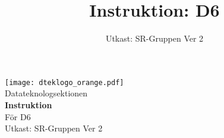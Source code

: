 \documentclass[a4paper]{dtek}
\title{Instruktion: D6}
\date{Utkast: SR-Gruppen Ver 2}
\begin{document}
\begin{titlepage}
  \thispagestyle{empty} %
  \vspace*{\fill}
  \begin{center}
    \texttt{[image: dteklogo\_orange.pdf]}\\[3em]
    {\Huge Datateknologsektionen}\\[3em]
    {\Huge \textbf{Instruktion}}\\[1em]
    {\Huge För D6}\\[3em]
    Utkast: SR-Gruppen Ver 2\\[20em]
  \end{center}
  \vspace*{\fill}
\end{titlepage}

\makeheadfoot

\setcounter{tocdepth}{2}
\tableofcontents
\end{document}
